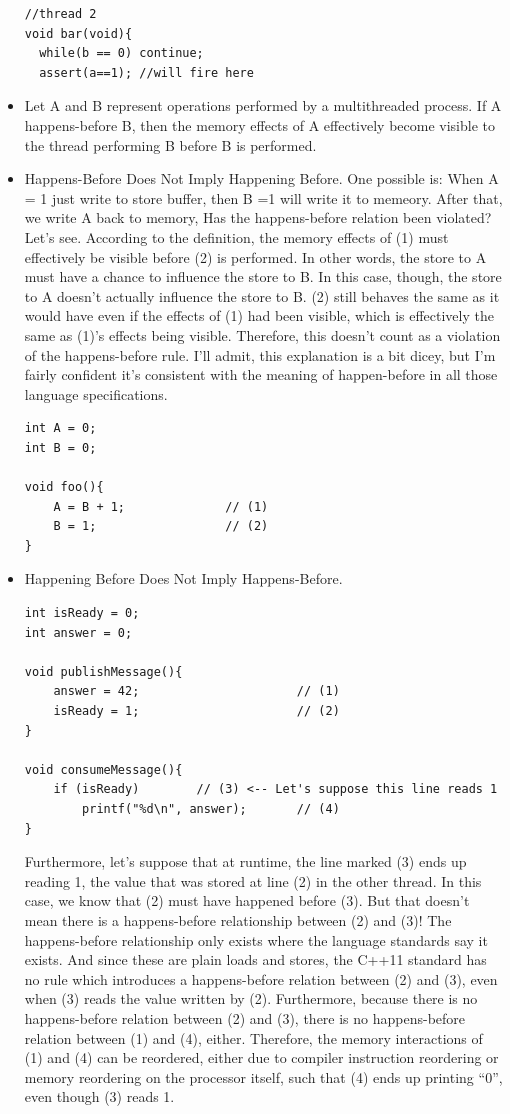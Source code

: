 \documentclass[a4paper,11pt,twoside]{book}
\begin{document}
\begin{itemize}
\begin{lstlisting}
//thread 2
void bar(void){
  while(b == 0) continue;
  assert(a==1); //will fire here
\end{lstlisting}

\item Let A and B represent operations performed by a multithreaded process. If A happens-before B, then the memory effects of A effectively become visible to the thread performing B before B is performed.


\item Happens-Before Does Not Imply Happening Before. One possible is: When A = 1 just write to store buffer, then B =1 will write it to memeory. After that, we write A back to memory, 
Has the happens-before relation been violated? Let’s see. According to the definition, the memory effects of (1) must effectively be visible before (2) is performed. In other words, the store to A must have a chance to influence the store to B. In this case, though, the store to A doesn’t actually influence the store to B. (2) still behaves the same as it would have even if the effects of (1) had been visible, which is effectively the same as (1)’s effects being visible. Therefore, this doesn’t count as a violation of the happens-before rule. I’ll admit, this explanation is a bit dicey, but I’m fairly confident it’s consistent with the meaning of happen-before in all those language specifications.

\begin{lstlisting}
int A = 0;
int B = 0;

void foo(){
    A = B + 1;              // (1)
    B = 1;                  // (2)
}
\end{lstlisting}

		\item Happening Before Does Not Imply Happens-Before.
\begin{lstlisting}
int isReady = 0;
int answer = 0;

void publishMessage(){
    answer = 42;                      // (1)
    isReady = 1;                      // (2)
}

void consumeMessage(){
    if (isReady)        // (3) <-- Let's suppose this line reads 1
        printf("%d\n", answer);       // (4)
}
\end{lstlisting}

Furthermore, let’s suppose that at runtime, the line marked (3) ends up reading 1, the value that was stored at line (2) in the other thread. In this case, we know that (2) must have happened before (3). But that doesn’t mean there is a happens-before relationship between (2) and (3)! The happens-before relationship only exists where the language standards say it exists. And since these are plain loads and stores, the C++11 standard has no rule which introduces a happens-before relation between (2) and (3), even when (3) reads the value written by (2). Furthermore, because there is no happens-before relation between (2) and (3), there is no happens-before relation between (1) and (4), either. Therefore, the memory interactions of (1) and (4) can be reordered, either due to compiler instruction reordering or memory reordering on the processor itself, such that (4) ends up printing “0”, even though (3) reads 1.



\end{itemize}
\end{document}
